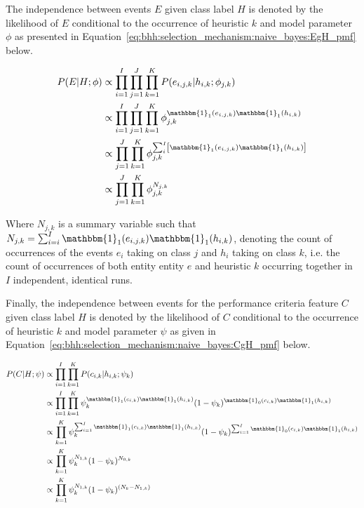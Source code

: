 The independence between events $E$ given class label $H$ is denoted by the likelihood of $E$
conditional to the occurrence of heuristic $k$ and model parameter $\phi$ as
presented in Equation~\eqref{eq:bhh:selection_mechanism:naive_bayes:EgH_pmf} below.

\begin{equation}
      \label{eq:bhh:selection_mechanism:naive_bayes:EgH_pmf}
      \begin{split}
            P(E \vert H;  \phi)
            &\propto \prod_{i=1}^{I} \prod_{j=1}^{J} \prod_{k=1}^{K} P(e_{i,j,k} \vert h_{i,k} ; \phi_{j,k})  \\
            &\propto \prod_{i=1}^{I} \prod_{j=1}^{J} \prod_{k=1}^{K} \phi_{j,k}^{\mathbbm{1}_{1}(e_{i,j,k})\mathbbm{1}_{1}(h_{i,k})} \\
            &\propto \prod_{j=1}^{J} \prod_{k=1}^{K} \phi_{j,k}^{ \sum_{i}^{I} \left[ \mathbbm{1}_{1}(e_{i,j,k}) \mathbbm{1}_{1}(h_{i,k}) \right]} \\
            &\propto \prod_{j=1}^{J} \prod_{k=1}^{K} \phi_{j,k}^{N_{j,k}}
      \end{split}
\end{equation}

Where $N_{j,k}$ is a summary variable such that $N_{j,k} = \sum_{i=i}^{I}
      \mathbbm{1}_{1}(e_{i,j,k})\mathbbm{1}_{1}(h_{i,k})$, denoting the count of
occurrences of the events $e_{i}$ taking on class $j$ and $h_{i}$ taking on
class $k$, i.e. the count of occurrences of both entity entity $e$ and heuristic
$k$ occurring together in $I$ independent, identical runs.

Finally, the independence between events for the performance criteria feature $C$ given class
label $H$ is denoted by the likelihood of $C$ conditional to the occurrence of
heuristic $k$ and model parameter $\psi$ as given in Equation~\eqref{eq:bhh:selection_mechanism:naive_bayes:CgH_pmf} below.

\begin{equation}
      \label{eq:bhh:selection_mechanism:naive_bayes:CgH_pmf}
      \begin{split}
            P(C\vert H;  \psi)
            &\propto\prod_{i=1}^{I} \prod_{k=1}^{K} P(c_{i,k} \vert h_{i,k} ; \psi_{k})  \\
            &\propto \prod_{i=1}^{I} \prod_{k=1}^{K} \psi_{k}^{\mathbbm{1}_{1}(c_{i,k})\mathbbm{1}_{1}(h_{i,k})} (1 - \psi_{k})^{\mathbbm{1}_{0}(c_{i,k})\mathbbm{1}_{1}(h_{i,k})}\\
            &\propto \prod_{k=1}^{K} \psi_{k}^{\sum_{i=1}^{I} \mathbbm{1}_{1}(c_{i,k})\mathbbm{1}_{1}(h_{i,k})} (1 - \psi_{k})^{\sum_{i=1}^{I} \mathbbm{1}_{0}(c_{i,k})\mathbbm{1}_{1}(h_{i,k})}\\
            &\propto \prod_{k=1}^{K} \psi_{k}^{N_{1,k}} (1 - \psi_{k})^{N_{0,k}} \\
            &\propto \prod_{k=1}^{K} \psi_{k}^{N_{1,k}} (1 - \psi_{k})^{(N_{k} - N_{1,k})}
      \end{split}
\end{equation}

